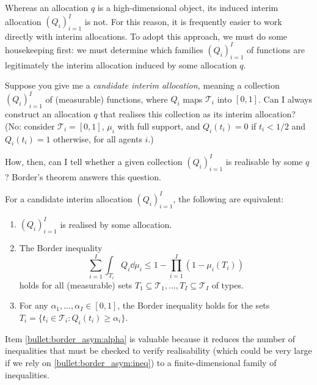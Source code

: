 Whereas an allocation $q$ is a high-dimensional object,
its induced interim allocation $(Q_i)_{i=1}^I$ is not.
For this reason, it is frequently easier to work directly with interim allocations.
To adopt this approach, we must do some housekeeping first:
we must determine which families $(Q_i)_{i=1}^I$ of functions
are legitimately the interim allocation induced by some allocation $q$.

Suppose you give me a \emph{candidate interim allocation,}
meaning a collection $(Q_i)_{i=1}^I$ of (measurable) functions, where $Q_i$ maps $\mathcal{T}_i$ into $[0,1]$.
Can I always construct an allocation $q$ that realises this collection as its interim allocation?
(No: consider $\mathcal{T}_i = [0,1]$, $\mu_i$ with full support, and $Q_i(t_i) = 0$ if $t_i<1/2$ and $Q_i(t_i)=1$ otherwise, for all agents $i$.)

How, then, can I tell whether a given collection $(Q_i)_{i=1}^I$ is realisable by some $q$? Border's theorem answers this question.


\begin{namedthm}
	\label{theorem:border_asym}
	For a candidate interim allocation $(Q_i)_{i=1}^I$,
	the following are equivalent:
	\begin{enumerate}
	
		\item \label{bullet:border_asym:real}
		$(Q_i)_{i=1}^I$ is realised by some allocation.

		\item \label{bullet:border_asym:ineq}
		The Border inequality
		\begin{equation*}
			\sum_{i=1}^I \int_{T_i} Q_i \dd \mu_i
			\leq 1 - \prod_{i=1}^I \left( 1 - \mu_i(T_i) \right)
		\end{equation*}
		holds for all (measurable) sets $T_1 \subseteq \mathcal{T}_1, \dots, T_I \subseteq \mathcal{T}_I$ of types.

		\item \label{bullet:border_asym:alpha}
		For any $\alpha_1,\dots,\alpha_I \in [0,1]$,
		the Border inequality holds for the sets $T_i = \{ t_i \in \mathcal{T}_i : Q_i(t_i) \geq \alpha_i \}$.
	
	\end{enumerate}
\end{namedthm}


Item \ref{bullet:border_asym:alpha} is valuable because it reduces the number of inequalities that must be checked to verify realisability (which could be very large if we rely on \ref{bullet:border_asym:ineq})
to a finite-dimensional family of inequalities.

